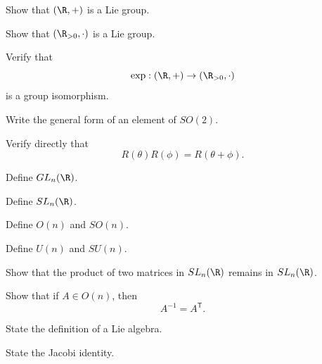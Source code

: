 \begin{exercise}[1]
Show that \((\R,+)\) is a Lie group.
\end{exercise}

\begin{exercise}[1]
Show that \((\R_{>0},\cdot)\) is a Lie group.
\end{exercise}

\begin{exercise}[2]
Verify that
\[ \exp:(\R,+)\to(\R_{>0},\cdot) \]
is a group isomorphism.
\end{exercise}

\begin{exercise}[1]
Write the general form of an element of \(SO(2)\).
\end{exercise}

\begin{exercise}[2]
Verify directly that
\[ R(\theta)R(\phi)=R(\theta+\phi). \]
\end{exercise}

\begin{exercise}[1]
Define \(GL_n(\R)\).
\end{exercise}

\begin{exercise}[1]
Define \(SL_n(\R)\).
\end{exercise}

\begin{exercise}[1]
Define \(O(n)\) and \(SO(n)\).
\end{exercise}

\begin{exercise}[1]
Define \(U(n)\) and \(SU(n)\).
\end{exercise}

\begin{exercise}[2]
Show that the product of two matrices in \(SL_n(\R)\) remains in
\(SL_n(\R)\).
\end{exercise}

\begin{exercise}[2]
Show that if \(A\in O(n)\), then
\[ A^{-1}=A^{\mathsf T}. \]
\end{exercise}

\begin{exercise}[1]
State the definition of a Lie algebra.
\end{exercise}

\begin{exercise}[1]
State the Jacobi identity.
\end{exercise}

